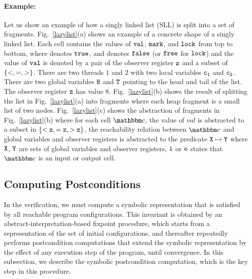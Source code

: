 \paragraph{Example:} Let us show an example of how a singly linked list (SLL) is split into a set of fragments. Fig.~\ref{lazylist}(a) shows an example of a concrete shape of a singly linked list. Each cell contains the values of $\tt val$, $\tt mark$, and $\tt lock$ from top to bottom, where \tick \; denotes $\tt true$, and \cross \; denotes $\tt false$ (or $\tt free$ for $\tt lock$) and the value of $\tt val$ is denoted by a pair of the observer register $\tt z$ and a subset of $\left\{<, =, >\right\}$. There are two threads $1$ and $2$ with two local variables $\tt c_1$ and $\tt c_2$. There are two global variables $\tt H$ and $\tt T$ pointing to the head and tail of the list. The observer register $\tt z$ has value 8. Fig.~\ref{lazylist}(b) shows the result of splitting the list in Fig.~\ref{lazylist}(a) into fragments where each heap fragment is a small list of two nodes. Fig.~\ref{lazylist}(c) shows the abstraction of fragments in Fig.~\ref{lazylist}(b) where for each cell $\cell$, the value of $val$ is abstracted to a subset in $\tt \{<z, =z, >z\}$, the reachability relation between $\cell$ and global variables and observer registers is abstracted to the predicate $\tt X \mapsto \tt Y$ where $\tt X$, $\tt Y$ are sets of global variables and observer registers, $\tt i$ or $\tt o$ states that $\cell$ is an input or output cell.

\subsection{Computing Postconditions}
In the  verification, we must compute a symbolic representation
that is satisfied by all reachable program configurations.
This invariant is obtained by an abstract-interpretation-based
fixpoint procedure, which starts
from a representation of the set of initial configurations, and
thereafter repeatedly performs
postcondition computations that extend the
symbolic representation by the effect of any execution step of the program,
until convergence.
In this subsection, we describe the symbolic postcondition computation, which
is the key step in this procedure.


